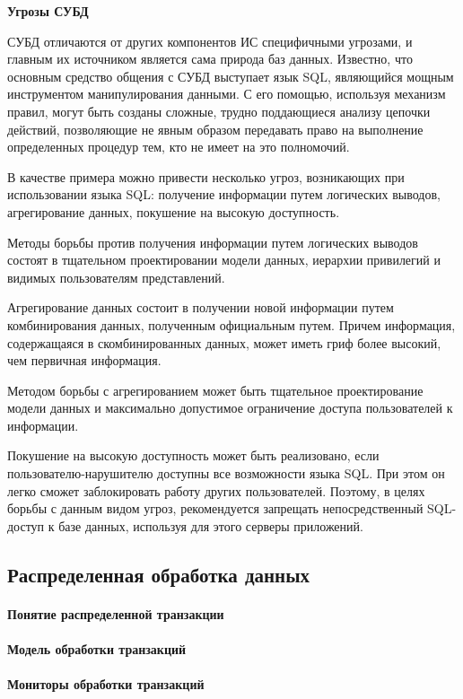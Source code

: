 \bigbreak
\textbf{Угрозы СУБД}

СУБД отличаются от других компонентов ИС специфичными угрозами, и главным их источником является сама природа баз данных. Известно, что основным средство общения с СУБД выступает язык SQL, являющийся мощным инструментом манипулирования данными. С его помощью, используя механизм правил, могут быть созданы сложные, трудно поддающиеся анализу цепочки действий, позволяющие не явным образом передавать право на выполнение определенных процедур тем, кто не имеет на это полномочий.

В качестве примера можно привести несколько угроз, возникающих при использовании языка SQL: получение информации путем логических выводов, агрегирование данных, покушение на высокую доступность.

Методы борьбы против получения информации путем логических выводов состоят в тщательном проектировании модели данных, иерархии привилегий и видимых пользователям представлений.

Агрегирование данных состоит в получении новой информации путем комбинирования данных, полученным официальным путем. Причем информация, содержащаяся в скомбинированных данных, может иметь гриф более высокий, чем первичная информация.

Методом борьбы с агрегированием может быть тщательное проектирование модели данных и максимально допустимое ограничение доступа пользователей к информации.

Покушение на высокую доступность может быть реализовано, если пользователю-нарушителю доступны все возможности языка SQL. При этом он легко сможет заблокировать работу других пользователей. Поэтому, в целях борьбы с данным видом угроз, рекомендуется запрещать непосредственный SQL-доступ к базе данных, используя для этого серверы приложений.


\subsection{Распределенная обработка данных}
\paragraph{Понятие распределенной транзакции}
\paragraph{Модель обработки транзакций}
\paragraph{Мониторы обработки транзакций}
